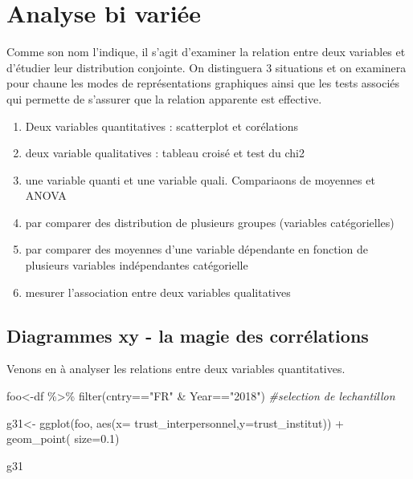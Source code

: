 \documentclass[
]{book}
\newenvironment{Shaded}{\begin{snugshade}}{\end{snugshade}}
\newcommand{\AttributeTok}[1]{\textcolor[rgb]{0.77,0.63,0.00}{#1}}
\newcommand{\CommentTok}[1]{\textcolor[rgb]{0.56,0.35,0.01}{\textit{#1}}}
\newcommand{\FloatTok}[1]{\textcolor[rgb]{0.00,0.00,0.81}{#1}}
\newcommand{\FunctionTok}[1]{\textcolor[rgb]{0.00,0.00,0.00}{#1}}
\newcommand{\NormalTok}[1]{#1}
\newcommand{\OtherTok}[1]{\textcolor[rgb]{0.56,0.35,0.01}{#1}}
\newcommand{\SpecialCharTok}[1]{\textcolor[rgb]{0.00,0.00,0.00}{#1}}
\newcommand{\StringTok}[1]{\textcolor[rgb]{0.31,0.60,0.02}{#1}}
\begin{document}
\hypertarget{analyse-bi-variuxe9e}{%
\chapter{Analyse bi variée}\label{analyse-bi-variuxe9e}}

Comme son nom l'indique, il s'agit d'examiner la relation entre deux variables et d'étudier leur distribution conjointe. On distinguera 3 situations et on examinera pour chaune les modes de représentations graphiques ainsi que les tests associés qui permette de s'assurer que la relation apparente est effective.

\begin{enumerate}
\def\labelenumi{\alph{enumi})}
\item
  Deux variables quantitatives : scatterplot et corélations
\item
  deux variable qualitatives : tableau croisé et test du chi2
\item
  une variable quanti et une variable quali. Compariaons de moyennes et ANOVA
\item
  par comparer des distribution de plusieurs groupes (variables catégorielles)
\item
  par comparer des moyennes d'une variable dépendante en fonction de plusieurs variables indépendantes catégorielle
\item
  mesurer l'association entre deux variables qualitatives
\end{enumerate}

\hypertarget{diagrammes-xy---la-magie-des-corruxe9lations}{%
\section{Diagrammes xy - la magie des corrélations}\label{diagrammes-xy---la-magie-des-corruxe9lations}}

Venons en à analyser les relations entre deux variables quantitatives.

\begin{Shaded}
\begin{Highlighting}[]
\NormalTok{foo}\OtherTok{\textless{}{-}}\NormalTok{df }\SpecialCharTok{\%\textgreater{}\%}
  \FunctionTok{filter}\NormalTok{(cntry}\SpecialCharTok{==}\StringTok{"FR"} \SpecialCharTok{\&}\NormalTok{ Year}\SpecialCharTok{==}\StringTok{"2018"}\NormalTok{) }\CommentTok{\#selection de l\textquotesingle{}echantillon}

\NormalTok{g31}\OtherTok{\textless{}{-}} \FunctionTok{ggplot}\NormalTok{(foo, }\FunctionTok{aes}\NormalTok{(}\AttributeTok{x=}\NormalTok{ trust\_interpersonnel,}\AttributeTok{y=}\NormalTok{trust\_institut)) }\SpecialCharTok{+}
  \FunctionTok{geom\_point}\NormalTok{( }\AttributeTok{size=}\FloatTok{0.1}\NormalTok{)}
     
\NormalTok{g31}
\end{Highlighting}
\end{Shaded}
\end{document}
